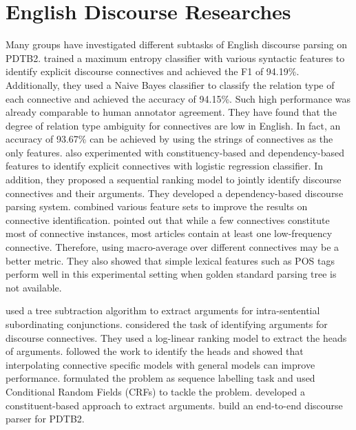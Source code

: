 \section{English Discourse Researches}

Many groups have investigated different subtasks of English
discourse parsing on PDTB2. \cite{pitler2009using} trained a maximum
entropy classifier with various syntactic features to identify explicit discourse
connectives and achieved the F1 of 94.19\%. Additionally, they used
a Naive Bayes classifier to classify the relation type of each connective and
achieved the accuracy of 94.15\%. Such high performance was already comparable to human
annotator agreement. They have found that the degree of relation type ambiguity
for connectives are low in English. In fact, an accuracy of 93.67\% can be achieved
by using the strings of connectives as the only features. \cite{wellner2009sequence}
also experimented with constituency-based and dependency-based features to identify
explicit connectives with logistic regression classifier. In addition, they proposed
a sequential ranking model to jointly identify discourse connectives and their arguments.
They developed a dependency-based discourse parsing system. \cite{faiz2013identifying} combined
various feature sets to improve the results on connective identification. \cite{j2013disambig} pointed
out that while a few connectives constitute most of connective instances, most articles contain
at least one low-frequency connective. Therefore, using macro-average over different connectives
may be a better metric. They also showed that simple lexical features such as POS tags perform
well in this experimental setting when golden standard parsing tree is not available.

\cite{dines2005attribution} used a tree subtraction algorithm to extract arguments for
intra-sentential subordinating conjunctions. \cite{wellner2007auto} considered the task of identifying
arguments for discourse connectives. They used a log-linear ranking model to extract the heads of arguments.
\cite{elwell2008discourse} followed the work to identify the heads and showed that
interpolating connective specific models with general models can improve performance.
\cite{ghosh2011shallow,ghosh2012global} formulated the problem as sequence labelling task
and used Conditional Random Fields (CRFs) to tackle the problem.
\cite{kong2014a} developed a constituent-based approach to extract arguments.
\cite{lin2014pdtb} build an end-to-end discourse parser for PDTB2.


